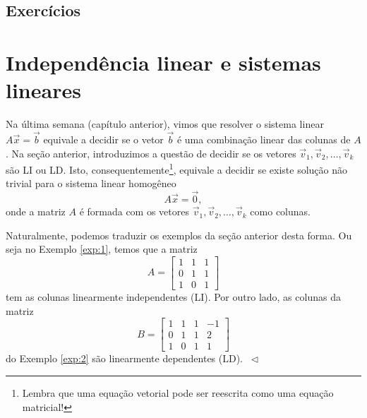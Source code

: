 \subsection*{Exercícios}

\construirExer


\section{Independência linear e sistemas lineares}

Na última semana (capítulo anterior), vimos que resolver o sistema linear $A \vec{x} = \vec{b}$ equivale a decidir se o vetor $\vec{b}$ é uma combinação linear das colunas de $A$. Na seção anterior, introduzimos a questão de decidir se os vetores $\vec{v}_1, \vec{v}_2, \dots, \vec{v}_k$ são LI ou LD. Isto, consequentemente\footnote{Lembra que uma equação vetorial pode ser reescrita como uma equação matricial!}, equivale a decidir se existe solução não trivial para o sistema linear homogêneo
\begin{equation}
A \vec{x} = \vec{0},
\end{equation} onde a matriz $A$ é formada com os vetores $\vec{v}_1, \vec{v}_2, \dots, \vec{v}_k$ como colunas.

\begin{ex}
Naturalmente, podemos traduzir os exemplos da seção anterior desta forma. Ou seja no Exemplo \ref{exp:1}, temos que a matriz
\begin{equation}
A = \left[
  \begin{array}{ccc}
    1 & 1 & 1  \\
    0 & 1 & 1   \\
    1 & 0 & 1 
    \end{array}
\right]
\end{equation} tem as colunas linearmente independentes (LI). Por outro lado, as colunas da matriz
\begin{equation}
B = \left[
  \begin{array}{cccc}
    1 & 1 & 1 & -1 \\
    0 & 1 & 1 & 2  \\
    1 & 0 & 1 & 1 
  \end{array}
\right]
\end{equation} do Exemplo \ref{exp:2} são linearmente dependentes (LD). $\ \lhd$
\end{ex}

